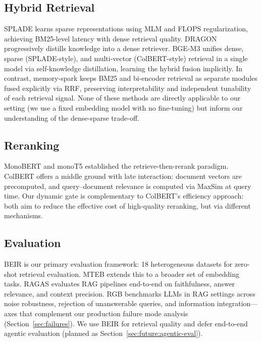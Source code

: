 \documentclass[11pt]{article}
\begin{document}
\subsection{Hybrid Retrieval}

SPLADE \citep{formal2021splade} learns sparse representations using MLM and FLOPS
regularization, achieving BM25-level latency with dense retrieval quality. DRAGON
\citep{lin2023dragon} progressively distills knowledge into a dense retriever.
BGE-M3 \citep{chen2024bgem3} unifies dense, sparse (SPLADE-style), and multi-vector
(ColBERT-style) retrieval in a single model via self-knowledge distillation, learning the
hybrid fusion implicitly. In contrast, memory-spark keeps BM25 and bi-encoder retrieval as
separate modules fused explicitly via RRF, preserving interpretability and independent
tunability of each retrieval signal. None of these methods are directly applicable to our
setting (we use a fixed embedding model with no fine-tuning) but inform our understanding of
the dense-sparse trade-off.

\subsection{Reranking}

MonoBERT \citep{nogueira2019passage} and monoT5 \citep{nogueira2020monot5} established
the retrieve-then-rerank paradigm. ColBERT \citep{khattab2020colbert} offers a middle
ground with late interaction: document vectors are precomputed, and query--document
relevance is computed via MaxSim at query time. Our dynamic gate is complementary to
ColBERT's efficiency approach: both aim to reduce the effective cost of high-quality
reranking, but via different mechanisms.

\subsection{Evaluation}

BEIR \citep{thakur2021beir} is our primary evaluation framework: 18 heterogeneous
datasets for zero-shot retrieval evaluation. MTEB \citep{muennighoff2023mteb} extends
this to a broader set of embedding tasks. RAGAS \citep{es2024ragas} evaluates RAG
pipelines end-to-end on faithfulness, answer relevance, and context precision.
RGB \citep{chen2024rgb} benchmarks LLMs in RAG settings across noise robustness, rejection
of unanswerable queries, and information integration---axes that complement our production
failure mode analysis (Section~\ref{sec:failures}). We use BEIR for retrieval quality
and defer end-to-end agentic evaluation (planned as Section~\ref{sec:future:agentic-eval}).
\end{document}
